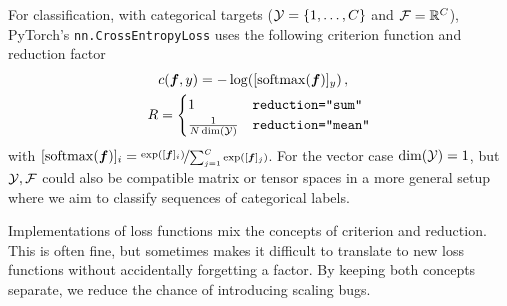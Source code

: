 \begin{example}\label{ex:cross_entropy_loss}
  For classification, with categorical targets (${\mathcal{Y}} = \{1, \dots, C\}$ and ${\mathcal{F}} = {\mathbb{R}}^C$), PyTorch's \texttt{nn.CrossEntropyLoss} uses the following criterion function and reduction factor
  \begin{align*}
    &c({\bm{f}}, y)
      =
      - \log([\mathrm{softmax}({\bm{f}})]_y)\,,
    \\
    R
    &=
      \begin{cases}
        1                     & \text{\texttt{reduction="sum"}}
        \\
        \frac{1}{N \dim({\mathcal{Y}})} & \text{\texttt{reduction="mean"}}
      \end{cases}
  \end{align*}
  with $[\mathrm{softmax}({\bm{f}})]_i = \nicefrac{\exp([{\bm{f}}]_i)}{\sum_{j=1}^C \exp([{\bm{f}}]_{j})}$.
  For the vector case $\dim({\mathcal{Y}}) = 1$, but ${\mathcal{Y}}, {\mathcal{F}}$ could also be compatible matrix or tensor spaces in a more general setup where we aim to classify sequences of categorical labels.
\end{example}
\switchcolumn[0]

\begin{caveat}[Scaling]
  Implementations of loss functions mix the concepts of criterion and reduction.
  This is often fine, but sometimes makes it difficult to translate to new loss functions without accidentally forgetting a factor.
  By keeping both concepts separate, we reduce the chance of introducing scaling bugs.
\end{caveat}

